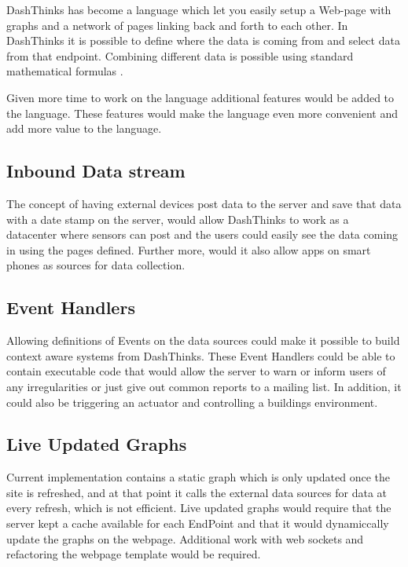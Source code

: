 \label{discussion}
DashThinks has become a language which let you easily setup a Web-page with graphs and a network
of pages linking back and forth to each other.
In DashThinks it is possible to define where the data is coming from and select data from that
endpoint. 
Combining different data is possible using standard mathematical formulas%
.

Given more time to work on the language additional features would be added to the language.
These features would make the language even more convenient and add more value to the language.

\subsection{Inbound Data stream} 
The concept of having external devices post data to the server and save that data with a
date stamp on the server, would allow DashThinks to work as a datacenter where sensors can
post and the users could easily see the data coming in using the pages defined. 
Further more, would it also allow apps on smart phones as sources for data collection.

\subsection{Event Handlers} 
Allowing definitions of Events on the data sources could make it possible to build context
aware systems from DashThinks. 
These Event Handlers could be able to contain executable code that would allow the
server to warn or inform users of any irregularities or just give out common reports to
a mailing list.
In addition, it could also be triggering an actuator and controlling a buildings environment.

\subsection{Live Updated Graphs}
Current implementation contains a static graph which is only updated once the site is
refreshed, and at that point it calls the external data sources for data at every refresh,
which is not efficient. Live updated graphs would require that the server kept a cache available
for each EndPoint and that it would dynamiccally update the graphs on the webpage. 
Additional work with web sockets and refactoring the webpage template would be required. 

